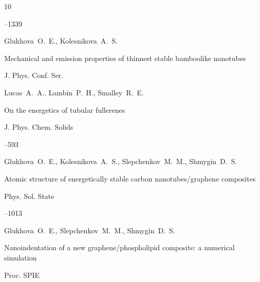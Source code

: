 \begin{thebibliography}{10}

--1339







\by Glukhova~O.~E., Kolesnikova~A.~S.

\paper Mechanical and emission properties of thinnest stable bamboolike nanotubes

\jour J. Phys. Conf. Ser.










\by Lucas~A.~A., Lambin~P.~H., Smalley~R.~E.

\paper On the energetics of tubular fullerenes

\jour J. Phys. Chem. Solids




--593





\by Glukhova~O.~E., Kolesnikova~A.~S., Slepchenkov~M.~M., Shmygin~D.~S.

\paper Atomic structure of energetically stable carbon nanotubes/graphene composites

\jour Phys. Sol. State




--1013





\by Glukhova~O.~E., Slepchenkov~M.~M., Shmygin~D.~S.

\paper Nanoindentation of a new graphene/phospholipid composite: a numerical simulation

\jour Proc. SPIE 



\end{thebibliography}
